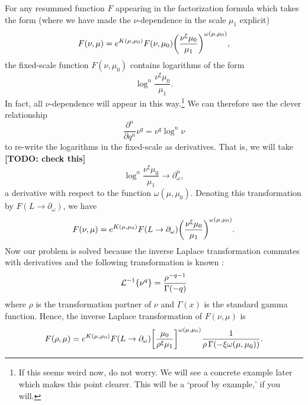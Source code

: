 \documentclass[../thesis.tex]{subfiles}
\providecommand{\cL}{\mathcal{L}}
\begin{document}
	For any resummed function $F$ appearing in the factorization formula which takes the form (where we have made the $\nu$-dependence in the scale $\mu_1$ explicit)
	\begin{equation}
		F(\nu, \mu) = e^{K(\mu, \mu_0)} F(\nu, \mu_0) \qty(\frac{\nu^\xi \mu_0}{\mu_1})^{\omega(\mu, \mu_0)},
	\end{equation}
	the fixed-scale function $F(\nu, \mu_0)$ contains logarithms of the form \cite{frye_factorization_2016}
	\begin{equation}
		\log^n \frac{\nu^\xi \mu_0}{\mu_1}.
	\end{equation}
	In fact, all $\nu$-dependence will appear in this way.\footnote{If this seems weird now, do not worry. We will see a concrete example later which makes this point clearer. This will be a `proof by example,' if you will.} We can therefore use the clever relationship \cite{becher_factorization_2007,frye_factorization_2016}
	\begin{equation}
		\frac{\partial^n}{\partial q^n} \nu^q = \nu^q \log^n \nu
	\end{equation}
	to re-write the logarithms in the fixed-scale as derivatives. That is, we will take {\color{red}\textbf{[TODO: check this]}}
	\begin{equation}
		\log^n \frac{\nu^\xi \mu_0}{\mu_1} \to \partial^n_{\omega},
	\end{equation}
	a derivative with respect to the function $\omega(\mu, \mu_0)$. Denoting this transformation by $F(L \to \partial_\omega)$, we have
	\begin{equation}
		F(\nu, \mu) = e^{K(\mu, \mu_0)} F(L \to \partial_\omega) \qty(\frac{\nu^\xi \mu_0}{\mu_1})^{\omega(\mu, \mu_0)}.
	\end{equation}
	Now our problem is solved because the inverse Laplace transformation commutes with derivatives and the following transformation is known \cite{frye_factorization_2016}:
	\begin{equation}
		\cL^{-1}\qty{\nu^q} = \frac{\rho^{-q - 1}}{\Gamma(-q)}
	\end{equation}
	where $\rho$ is the transformation partner of $\nu$ and $\Gamma(x)$ is the standard gamma function. Hence, the inverse Laplace transformation of $F(\nu, \mu)$ is
	\begin{equation}\label{all-eq:resummed inverse Laplace transform}
		F(\rho, \mu) = e^{K(\mu, \mu_0)} F(L \to \partial_\omega)\qty[\frac{\mu_0}{\rho^\xi\mu_1}]^{\omega(\mu, \mu_0)} \frac{1}{\rho\,\Gamma(-\xi \omega(\mu, \mu_0))}.
	\end{equation}
\end{document}
